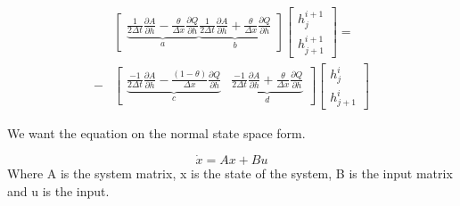 \begin{equation}
\begin{aligned}
	&\begin{bmatrix}
		\underbrace{\frac{1}{2\Delta t}\frac{\partial A}{\partial h}-\frac{\theta}{\Delta x}\frac{\partial Q}{\partial h}}_{a}   \underbrace{\frac{1}{2\Delta t}\frac{\partial A}{\partial h}+\frac{\theta}{\Delta x}\frac{\partial Q}{\partial h}}_{b} 
	\end{bmatrix}
	\begin{bmatrix}
		h_{j}^{i+1} \\
		h_{j+1}^{i+1}
	\end{bmatrix}
	= \\ -
	&\begin{bmatrix}
		\underbrace{\frac{-1}{2\Delta t}\frac{\partial A}{\partial h}-\frac{(1-\theta)}{\Delta x}\frac{\partial Q}{\partial h}}_{c} & \underbrace{\frac{-1}{2\Delta t}\frac{\partial A}{\partial h}+\frac{\theta}{\Delta x}\frac{\partial Q}{\partial h}}_{d} 
	\end{bmatrix}
	\begin{bmatrix}
		h_{j}^{i} \\
		h_{j+1}^{i}
	\end{bmatrix}
	\end{aligned}
\end{equation}

We want the equation on the normal state space form.

\begin{equation}
	\dot{x} = Ax + Bu
\end{equation}
Where A is the system matrix, x is the state of the system, B is the input matrix and u is the input. 

